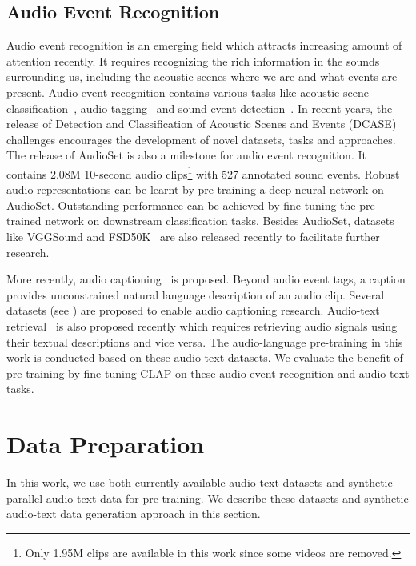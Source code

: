 \documentclass[sigconf,anonymous,review]{acmart}
\begin{document}
\subsection{Audio Event Recognition}
Audio event recognition is an emerging field which attracts increasing amount of attention recently.
It requires recognizing the rich information in the sounds surrounding us, including the acoustic scenes where we are and what events are present.
Audio event recognition contains various tasks like acoustic scene classification~\cite{mesaros2018multi}, audio tagging~\cite{gemmeke2017audio} and sound event detection~\cite{cakir2015polyphonic}.
In recent years, the release of Detection and Classification of Acoustic Scenes and Events (DCASE) challenges encourages the development of novel datasets, tasks and approaches.
The release of AudioSet is also a milestone for audio event recognition.
It contains 2.08M 10-second audio clips\footnote{Only 1.95M clips are available in this work since some videos are removed.} with 527 annotated sound events.
Robust audio representations can be learnt by pre-training a deep neural network on AudioSet.
Outstanding performance can be achieved by fine-tuning the pre-trained network on downstream classification tasks.
Besides AudioSet, datasets like VGGSound and FSD50K~\cite{fonseca2022fsd50k} are also released recently to facilitate further research.

More recently, audio captioning~\cite{drossos2017automated} is proposed.
Beyond audio event tags, a caption provides unconstrained natural language description of an audio clip.
Several datasets (see ) are proposed to enable audio captioning research.
Audio-text retrieval~\cite{oncescu21audio} is also proposed recently which requires retrieving audio signals using their textual descriptions and vice versa.
The audio-language pre-training in this work is conducted based on these audio-text datasets.
We evaluate the benefit of pre-training by fine-tuning CLAP on these audio event recognition and audio-text tasks.



\section{Data Preparation}
In this work, we use both currently available audio-text datasets and synthetic parallel audio-text data for pre-training.
We describe these datasets and synthetic audio-text data generation approach in this section. 
\end{document}
